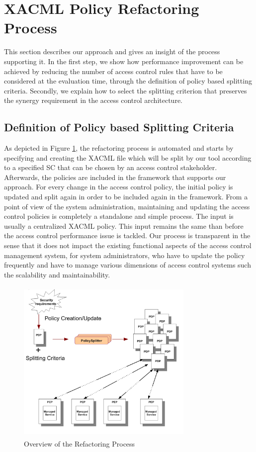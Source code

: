 \section{XACML Policy Refactoring Process} \label{sec:approach}
This section describes our approach and gives an insight of the process supporting it. In the first step, we show how performance improvement can be achieved by
reducing the number of access control rules that have to be considered at the evaluation time, through the definition of policy based splitting criteria. 
Secondly, we explain how to select the splitting criterion that preserves the synergy requirement in the access control architecture.
\subsection{Definition of Policy based Splitting Criteria}
As depicted in Figure \ref{overallprocess}, the refactoring process is automated and starts by specifying and creating the XACML file which 
will be split by our tool according to a specified SC that can be chosen by an access control stakeholder. Afterwards, the policies are included in the 
framework that supports our approach. For every change in the access control policy, the initial policy is updated and 
split again in order to be included again in the framework.
From a point of view of the system administration, maintaining and updating the access control policies is completely a standalone and simple
 process. The input is usually a centralized XACML policy. This input remains the same than before the access control performance issue is tackled.
Our process is transparent in the sense that it does not impact the existing functional aspects of the access control management system, 
for system administrators, who have to update the policy frequently and have to manage various dimensions of access control 
systems such the scalability and maintainability.
\begin{figure}[!h]
\begin{center}
\includegraphics[width=8.5cm, height=8cm]{Overall-process}
\caption{Overview of the Refactoring Process}
\label{overallprocess}
\end{center}
\end{figure} 


